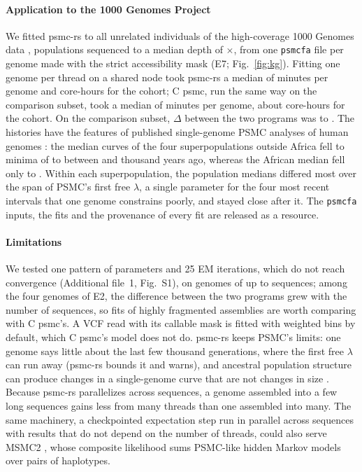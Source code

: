\documentclass[a4paper,num-refs,gigabyte]{oup-contemporary}%
\newcommand{\psmcrs}{psmc-rs}
\begin{document}
\paragraph{Application to the 1000 Genomes Project} We fitted \psmcrs{} to all \EsevenGenomes{} unrelated individuals of the high-coverage 1000 Genomes data \citep{byrskabishop2022}, \EsevenPops{} populations sequenced to a median depth of \EsevenDepth{}$\times$, from one \texttt{psmcfa} file per genome made with the strict accessibility mask \citep{kgp2015} (E7; Fig.~\ref{fig:kg}). Fitting one genome per thread on a shared node took \psmcrs{} a median of \EsevenRsFitMin{} minutes per genome and \EsevenRsCoreHours{} core-hours for the cohort; C psmc, run the same way on the comparison subset, took a median of \EsevenCFitMin{} minutes per genome, about \EsevenCCoreHoursAll{} core-hours for the cohort. On the comparison subset, $\Delta$ between the two programs was \EsevenRsCRmseMin{} to \EsevenRsCRmseMax{}. The histories have the features of published single-genome PSMC analyses of human genomes \citep{li2011,prufer2014,mallick2016}: the median curves of the four superpopulations outside Africa fell to minima of \EsevenNonAfrMinNeLo{} to \EsevenNonAfrMinNeHi{} between \EsevenNonAfrMinKyLo{} and \EsevenNonAfrMinKyHi{} thousand years ago, whereas the African median fell only to \EsevenAfrMinNe{}. Within each superpopulation, the population medians differed most over the span of PSMC's first free $\lambda$, a single parameter for the four most recent intervals that one genome constrains poorly, and stayed close after it. The \texttt{psmcfa} inputs, the fits and the provenance of every fit are released as a resource.

\paragraph{Limitations} We tested one pattern of parameters and 25 EM iterations, which do not reach convergence (Additional file~1, Fig.~S1), on genomes of up to \EtwoTurtleSeqMax{} sequences; among the four genomes of E2, the difference between the two programs grew with the number of sequences, so fits of highly fragmented assemblies are worth comparing with C psmc's. A VCF read with its callable mask is fitted with weighted bins by default, which C psmc's model does not do. \psmcrs{} keeps PSMC's limits: one genome says little about the last few thousand generations, where the first free $\lambda$ can run away (\psmcrs{} bounds it and warns), and ancestral population structure can produce changes in a single-genome curve that are not changes in size \citep{mazet2016,cousins2025}. Because \psmcrs{} parallelizes across sequences, a genome assembled into a few long sequences gains less from many threads than one assembled into many. The same machinery, a checkpointed expectation step run in parallel across sequences with results that do not depend on the number of threads, could also serve MSMC2 \citep{schiffels2020}, whose composite likelihood sums PSMC-like hidden Markov models over pairs of haplotypes.
\end{document}
